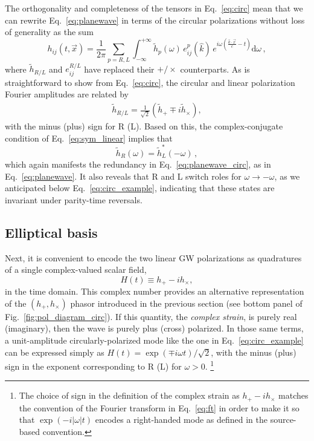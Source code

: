 \documentclass[aps,prd,twocolumn,superscriptaddress,preprintnumbers,floatfix,nofootinbib]{revtex4-2}
\newcommand{\beq}{\begin{equation}}
\newcommand{\eeq}{\end{equation}}
\newcommand*{\eq}[1]{Eq.~\eqref{eq:#1}}
\newcommand{\infd}{\mathrm{d}}
\begin{document}
The orthogonality and completeness of the tensors in Eq.~\eqref{eq:circ} mean that we can rewrite Eq.~\eqref{eq:planewave} in terms of the circular polarizations without loss of generality as the sum
\beq \label{eq:planewave_circ}
h_{ij}(t,\vec{x}) 
= \frac{1}{2\pi} \sum_{p=R,L} \int_{-\infty}^{+\infty} \tilde{h}_p(\omega)\, e^p_{ij}(\hat{k})\, e^{i\omega \left(\frac{\hat{k}\cdot\vec{x}}{c}-t\right)} \infd \omega \, ,
\eeq
where $\tilde{h}_{R/L}$ and $e^{R/L}_{ij}$ have replaced their $+/\times$ counterparts.
As is straightforward to show from Eq.~\eqref{eq:circ}, the circular and linear polarization Fourier amplitudes are related by
\begin{align} \label{eq:circ_amps}
\tilde{h}_{R/L} = \frac{1}{\sqrt{2}} \left(\tilde{h}_+ \mp i\tilde{h}_\times \right) ,
\end{align}
with the minus (plus) sign for R (L).
Based on this, the complex-conjugate condition of Eq.~\eqref{eq:sym_linear} implies that
\beq \label{eq:sym_circular}
\tilde{h}_R(\omega) = \tilde{h}_L^*(-\omega) \, ,
\eeq
which again manifests the redundancy in Eq.~\eqref{eq:planewave_circ}, as in Eq.~\eqref{eq:planewave}.
It also reveals that R and L switch roles for $\omega \to - \omega$, as we anticipated below Eq.~\eqref{eq:circ_example}, indicating that these states are invariant under parity-time reversals.


\subsection{Elliptical basis}
\label{sec:ellip}

Next, it is convenient to encode the two linear GW polarizations as quadratures of a single complex-valued scalar field, 
\beq
H(t) \equiv h_+ - i h_\times,
\eeq
in the time domain.
This complex number provides an alternative representation of the $\left(h_+, h_\times\right)$ phasor introduced in the previous section (see bottom panel of Fig.~\ref{fig:pol_diagram_circ}).
If this quantity, the \emph{complex strain}, is purely real (imaginary), then the wave is purely plus (cross) polarized.
In those same terms, a unit-amplitude circularly-polarized mode like the one in \eq{circ_example} can be expressed simply as $H(t)  = \exp(\mp i \omega t)/\sqrt{2}$, with the minus (plus) sign in the exponent corresponding to R (L) for $\omega > 0$.%
\footnote{The choice of sign in the definition of the complex strain as $h_+ - ih_\times$ matches the convention of the Fourier transform in Eq.~\eqref{eq:ft} in order to make it so that $\exp(-i|\omega| t)$ encodes a right-handed mode as defined in the source-based convention.}
\end{document}
